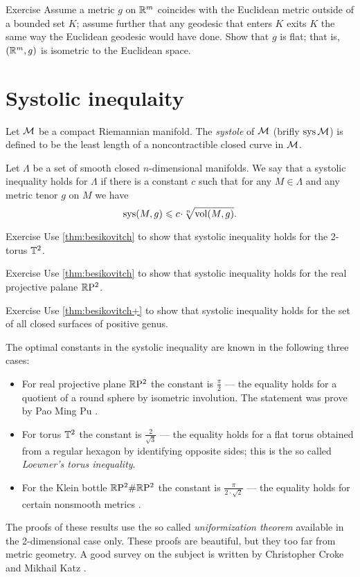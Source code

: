 \begin{thm}{Exercise}
Assume a metric $g$ on $\mathbb{R}^m$ coincides with the Euclidean metric outside of a bounded set $K$;
assume further that any geodesic that enters $K$ exits $K$ the same way the Euclidean geodesic would have done. 
Show that $g$ is flat; that is, $(\mathbb{R}^m,g)$ is isometric to the Euclidean space. 
\end{thm}

\section{Systolic inequlaity}

Let $\mathcal{M}$ be a compact Riemannian manifold.
The \emph{systole} of $\mathcal{M}$ (brifly $\mathop{\rm sys}\nolimits\mathcal{M}$) is defined to be the least length of a noncontractible closed curve in $\mathcal{M}$.

Let $\Lambda$ be a set of smooth closed $n$-dimensional manifolds.
We say that a systolic inequality holds for $\Lambda$ if there is a constant $c$ such that for any $M\in \Lambda$ and any metric tenor $g$ on $M$ we have
\[\sys(M,g)\le c\cdot \sqrt[n]{\vol(M,g)}.\]

\begin{thm}{Exercise}\label{ex:sysT2}
Use \ref{thm:besikovitch} to show that systolic inequality holds for the 2-torus $\mathbb{T}^2$.
\end{thm}

\begin{thm}{Exercise}\label{ex:sysRP2}
Use \ref{thm:besikovitch} to show that systolic inequality holds for the real projective palane $\mathbb{R}\mathrm{P}^2$.
\end{thm}

\begin{thm}{Exercise}\label{ex:sysSg}
Use \ref{thm:besikovitch+} to show that systolic inequality holds for the set of all closed surfaces of positive genus.
\end{thm}

The optimal constants in the systolic inequality are known in the following three cases:
\begin{itemize}
\item For real projective plane $\mathbb{R}\mathrm{P}^2$ the constant is $\tfrac\pi2$ --- the equality holds for a quotient of a round sphere by isometric involution. The statement was prove by Pao Ming Pu \cite{pu}.\label{page:pu}
\item For torus $\mathbb{T}^2$ the constant is $\tfrac2{\sqrt{3}}$ --- the equality holds for a flat torus obtained from a regular hexagon by identifying opposite sides; this is the so called \emph{Loewner's torus inequality}.
\item For the Klein bottle $\mathbb{R}\mathrm{P}^2\#\mathbb{R}\mathrm{P}^2$  the constant is $\tfrac\pi{2\cdot\sqrt2}$ --- the equality holds for certain nonsmooth metrics \cite{bavard}.
\end{itemize}
The proofs of these results use the so called \emph{uniformization theorem}   available in the 2-dimensional case only.
These proofs are beautiful, but they too far from metric geometry.
A good survey on the subject is written by Christopher Croke and Mikhail Katz \cite{croke-katz}.

